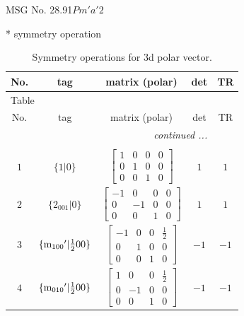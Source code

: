 \documentclass[fleqn,8pt]{jsarticle}
\begin{document}
\setcounter{MaxMatrixCols}{32}

\renewcommand{\tablename}{Table~}
\renewcommand{\figurename}{Figure~}
\begin{center}
\LARGE
MSG No. 28.91\quad$Pm'a'2$
\end{center}
* symmetry operation
\renewcommand{\arraystretch}{1.3}
\begin{longtable}{ccccc}
\caption{Symmetry operations for 3d polar vector.}
 \\
 \hline \hline
No. & tag & matrix (polar) & det & TR \\ \hline \endfirsthead

\multicolumn{4}{l}{\tablename\ \thetable{}} \\
 \hline \hline
No. & tag & matrix (polar) & det & TR \\ \hline \endhead

 \hline \hline
\multicolumn{4}{r}{\footnotesize\it continued ...} \\ \endfoot

 \hline \hline
\multicolumn{4}{r}{} \\ \endlastfoot

$ 1 $ & $ \{1|0\} $ & $ \begin{bmatrix} 1 & 0 & 0 & 0 \\ 0 & 1 & 0 & 0 \\ 0 & 0 & 1 & 0 \end{bmatrix} $ & $ 1 $ & $ 1 $ \\ \hline
$ 2 $ & $ \{2{}_{001}|0\} $ & $ \begin{bmatrix} -1 & 0 & 0 & 0 \\ 0 & -1 & 0 & 0 \\ 0 & 0 & 1 & 0 \end{bmatrix} $ & $ 1 $ & $ 1 $ \\ \hline
$ 3 $ & $ \{{\rm m}_{100}{}'|\frac{1}{2} 0 0\} $ & $ \begin{bmatrix} -1 & 0 & 0 & \frac{1}{2} \\ 0 & 1 & 0 & 0 \\ 0 & 0 & 1 & 0 \end{bmatrix} $ & $ -1 $ & $ -1 $ \\ \hline
$ 4 $ & $ \{{\rm m}_{010}{}'|\frac{1}{2} 0 0\} $ & $ \begin{bmatrix} 1 & 0 & 0 & \frac{1}{2} \\ 0 & -1 & 0 & 0 \\ 0 & 0 & 1 & 0 \end{bmatrix} $ & $ -1 $ & $ -1 $ \\
\end{longtable}
\end{document}
